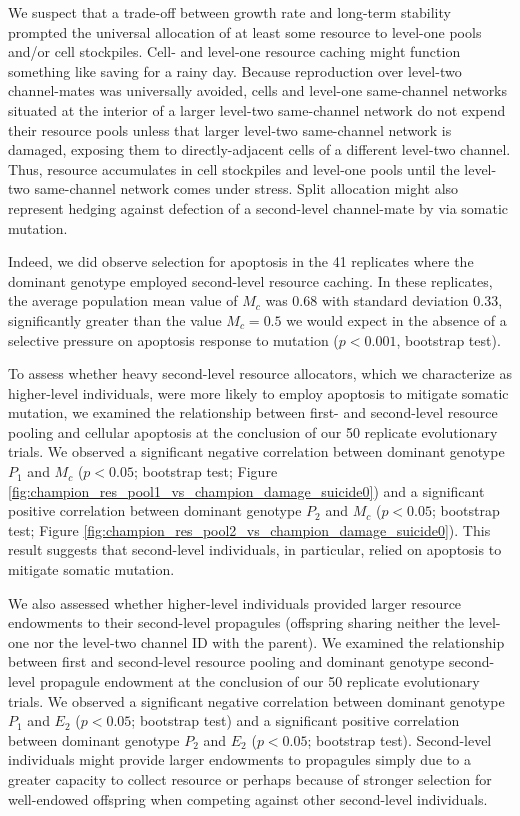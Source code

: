 We suspect that a trade-off between growth rate and long-term stability prompted the universal allocation of at least some resource to level-one pools and/or cell stockpiles.
Cell- and level-one resource caching might function something like saving for a rainy day.
Because reproduction over level-two channel-mates was universally avoided, cells and level-one same-channel networks situated at the interior of a larger level-two same-channel network do not expend their resource pools unless that larger level-two same-channel network is damaged, exposing them to directly-adjacent cells of a different level-two channel.
Thus, resource accumulates in cell stockpiles and level-one pools until the level-two same-channel network comes under stress.
Split allocation might also represent hedging against defection of a second-level channel-mate by via somatic mutation.

Indeed, we did observe selection for apoptosis in the 41 replicates where the dominant genotype employed second-level resource caching.
In these replicates, the average population mean value of $M_{c}$ was 0.68 with standard deviation 0.33, significantly greater than the value $M_{c} = 0.5$ we would expect in the absence of a selective pressure on apoptosis response to mutation ($p < 0.001$, bootstrap test).



To assess whether heavy second-level resource allocators, which we characterize as higher-level individuals, were more likely to employ apoptosis to mitigate somatic mutation, we examined the relationship between first- and second-level resource pooling and cellular apoptosis at the conclusion of our 50 replicate evolutionary trials.
We observed a significant negative correlation between dominant genotype $P_1$ and $M_{c}$ ($p < 0.05$; bootstrap test; Figure \ref{fig:champion_res_pool1_vs_champion_damage_suicide0}) and a significant positive correlation between dominant genotype $P_2$ and $M_{c}$ ($p < 0.05$; bootstrap test; Figure \ref{fig:champion_res_pool2_vs_champion_damage_suicide0}).
This result suggests that second-level individuals, in particular, relied on apoptosis to mitigate somatic mutation.

We also assessed whether higher-level individuals provided larger resource endowments to their second-level propagules (offspring sharing neither the level-one nor the level-two channel ID with the parent).
We examined the relationship between first and second-level resource pooling and dominant genotype second-level propagule endowment at the conclusion of our 50 replicate evolutionary trials.
We observed a significant negative correlation between dominant genotype $P_1$ and $E_2$ ($p < 0.05$; bootstrap test) and a significant positive correlation between dominant genotype $P_2$ and $E_2$ ($p <  0.05$; bootstrap test).
Second-level individuals might provide larger endowments to propagules simply due to a greater capacity to collect resource or perhaps because of stronger selection for well-endowed offspring when competing against other second-level individuals.

